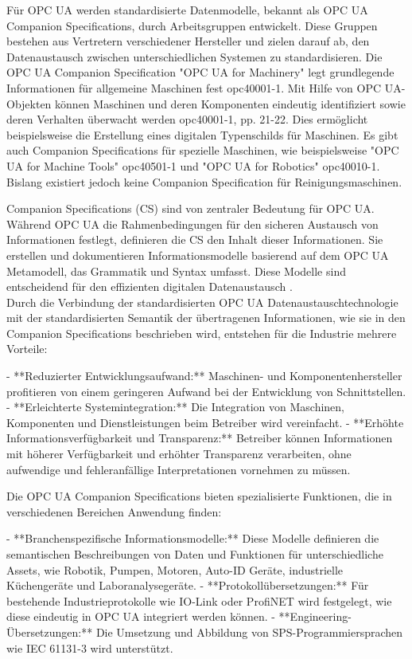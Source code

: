 Für OPC UA werden standardisierte Datenmodelle, bekannt als OPC UA Companion Specifications, durch Arbeitsgruppen entwickelt. Diese Gruppen bestehen aus Vertretern verschiedener Hersteller und zielen darauf ab, den Datenaustausch zwischen unterschiedlichen Systemen zu standardisieren. Die OPC UA Companion Specification "OPC UA for Machinery" legt grundlegende Informationen für allgemeine Maschinen fest {opc40001-1}. Mit Hilfe von OPC UA-Objekten können Maschinen und deren Komponenten eindeutig identifiziert sowie deren Verhalten überwacht werden {opc40001-1, pp. 21-22}. Dies ermöglicht beispielsweise die Erstellung eines digitalen Typenschilds für Maschinen. Es gibt auch Companion Specifications für spezielle Maschinen, wie beispielsweise "OPC UA for Machine Tools" {opc40501-1} und "OPC UA for Robotics" {opc40010-1}. Bislang existiert jedoch keine Companion Specification für Reinigungsmaschinen.

Companion Specifications (CS) sind von zentraler Bedeutung für OPC UA. Während OPC UA die Rahmenbedingungen für den sicheren Austausch von Informationen festlegt, definieren die CS den Inhalt dieser Informationen. Sie erstellen und dokumentieren Informationsmodelle basierend auf dem OPC UA Metamodell, das Grammatik und Syntax umfasst. Diese Modelle sind entscheidend für den effizienten digitalen Datenaustausch \cite{drathDiskussionspapierInteroperabilitatMit2023}.\\

Durch die Verbindung der standardisierten OPC UA Datenaustauschtechnologie mit der standardisierten Semantik der übertragenen Informationen, wie sie in den Companion Specifications beschrieben wird, entstehen für die Industrie mehrere Vorteile:

- **Reduzierter Entwicklungsaufwand:** Maschinen- und Komponentenhersteller profitieren von einem geringeren Aufwand bei der Entwicklung von Schnittstellen.
- **Erleichterte Systemintegration:** Die Integration von Maschinen, Komponenten und Dienstleistungen beim Betreiber wird vereinfacht.
- **Erhöhte Informationsverfügbarkeit und Transparenz:** Betreiber können Informationen mit höherer Verfügbarkeit und erhöhter Transparenz verarbeiten, ohne aufwendige und fehleranfällige Interpretationen vornehmen zu müssen.

Die OPC UA Companion Specifications bieten spezialisierte Funktionen, die in verschiedenen Bereichen Anwendung finden:

- **Branchenspezifische Informationsmodelle:** Diese Modelle definieren die semantischen Beschreibungen von Daten und Funktionen für unterschiedliche Assets, wie Robotik, Pumpen, Motoren, Auto-ID Geräte, industrielle Küchengeräte und Laboranalysegeräte.
- **Protokollübersetzungen:** Für bestehende Industrieprotokolle wie IO-Link oder ProfiNET wird festgelegt, wie diese eindeutig in OPC UA integriert werden können.
- **Engineering-Übersetzungen:** Die Umsetzung und Abbildung von SPS-Programmiersprachen wie IEC 61131-3 wird unterstützt.

